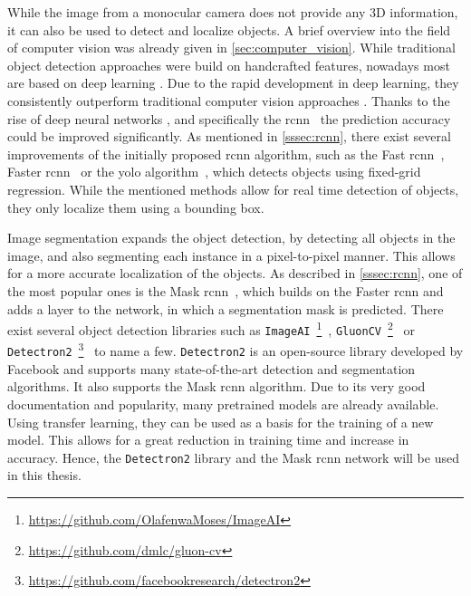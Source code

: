 While the image from a monocular camera does not provide any 3D information, it can also be used to detect and localize objects.
A brief overview into the field of computer vision was already given in \cref{sec:computer_vision}.
While traditional object detection approaches were build on handcrafted features, nowadays most are based on deep learning \cite{Zhao2019}.
Due to the rapid development in deep learning, they consistently outperform traditional computer vision approaches \cite{Mahony2019}.
Thanks to the rise of deep neural networks \cite{Krizhevsky2017}, and specifically the \gls{rcnn}~\cite{Girshick2014} the prediction accuracy could be improved significantly.
As mentioned in \cref{sssec:rcnn}, there exist several improvements of the initially proposed \gls{rcnn} algorithm, such as the Fast \gls{rcnn}~\cite{Girshick2015}, Faster \gls{rcnn}~\cite{Ren2017} or the \gls{yolo} algorithm~\cite{Redmon2016}, which detects objects using fixed-grid regression.
While the mentioned methods allow for real time detection of objects, they only localize them using a bounding box.

Image segmentation expands the object detection, by detecting all objects in the image, and also segmenting each instance in a pixel-to-pixel manner.
This allows for a more accurate localization of the objects.
As described in \cref{sssec:rcnn}, one of the most popular ones is the Mask \gls{rcnn}~\cite{He2017}, which builds on the Faster \gls{rcnn} and adds a layer to the network, in which a segmentation mask is predicted.
There exist several object detection libraries such as \texttt{ImageAI}~\footnote{\url{https://github.com/OlafenwaMoses/ImageAI}}~\cite{Olafenwa2018}, \texttt{GluonCV}~\footnote{\url{https://github.com/dmlc/gluon-cv}}~\cite{Guo2020} or \texttt{Detectron2}~\footnote{\url{https://github.com/facebookresearch/detectron2}}~\cite{Wu2019} to name a few.
\texttt{Detectron2} is an open-source library developed by Facebook and supports many state-of-the-art detection and segmentation algorithms.
It also supports the Mask \gls{rcnn} algorithm.
Due to its very good documentation and popularity, many pretrained models are already available.
Using transfer learning, they can be used as a basis for the training of a new model.
This allows for a great reduction in training time and increase in accuracy.
Hence, the \texttt{Detectron2} library and the Mask \gls{rcnn} network will be used in this thesis.